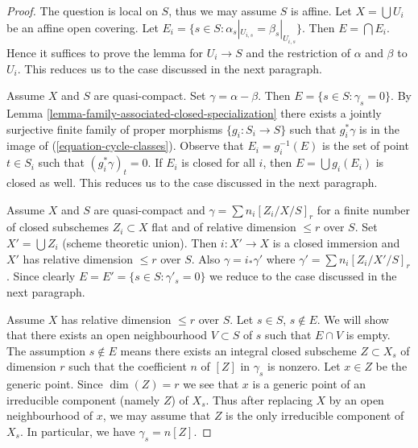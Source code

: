 \begin{proof}
The question is local on $S$, thus we may assume $S$ is affine.
Let $X = \bigcup U_i$ be an affine open covering. Let
$E_i = \{s \in S : \alpha_s|_{U_{i, s}} = \beta_s|_{U_{i, s}}\}$.
Then $E = \bigcap E_i$. Hence it suffices to prove the lemma for
$U_i \to S$ and the restriction of $\alpha$ and $\beta$ to $U_i$.
This reduces us to the case discussed in the next paragraph.

\medskip\noindent
Assume $X$ and $S$ are quasi-compact.
Set $\gamma = \alpha - \beta$. Then $E = \{s \in S : \gamma_s = 0\}$.
By Lemma \ref{lemma-family-associated-closed-specialization}
there exists a jointly surjective finite family of proper morphisms
$\{g_i : S_i \to S\}$ such that $g_i^*\gamma$ is in the image
of (\ref{equation-cycle-classes}). Observe that $E_i = g_i^{-1}(E)$ is
the set of point $t \in S_i$ such that $(g_i^*\gamma)_t = 0$.
If $E_i$ is closed for all $i$, then $E = \bigcup g_i(E_i)$
is closed as well. This reduces us to the case discussed in the next
paragraph.

\medskip\noindent
Assume $X$ and $S$ are quasi-compact and $\gamma = \sum n_i[Z_i/X/S]_r$
for a finite number of closed subschemes $Z_i \subset X$
flat and of relative dimension $\leq r$ over $S$.
Set $X' = \bigcup Z_i$ (scheme theoretic union).
Then $i : X' \to X$ is a closed immersion and $X'$
has relative dimension $\leq r$ over $S$. Also
$\gamma = i_*\gamma'$ where $\gamma' = \sum n_i[Z_i/X'/S]_r$.
Since clearly $E = E' = \{s \in S : \gamma'_s = 0\}$
we reduce to the case discussed in the next paragraph.

\medskip\noindent
Assume $X$ has relative dimension $\leq r$ over $S$.
Let $s \in S$, $s \not \in E$. We will show that there exists an
open neighbourhood $V \subset S$ of $s$ such that $E \cap V$ is empty.
The assumption $s \not \in E$ means there exists an integral closed
subscheme $Z \subset X_s$ of dimension $r$ such that the coefficient
$n$ of $[Z]$ in $\gamma_s$ is nonzero. Let $x \in Z$ be the
generic point. Since $\dim(Z) = r$ we see that $x$ is a generic
point of an irreducible component (namely $Z$) of $X_s$.
Thus after replacing $X$ by an open neighbourhood of $x$,
we may assume that $Z$ is the only irreducible component of $X_s$.
In particular, we have $\gamma_s = n[Z]$.


\end{proof}
